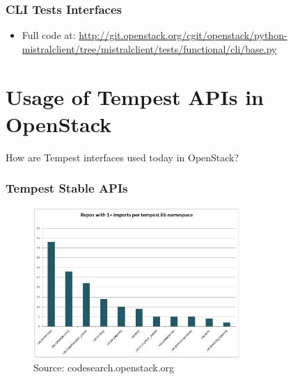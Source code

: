 \documentclass[aspectratio=169,11pt,hyperref={colorlinks=true}]{beamer}
\begin{document}
\begin{frame}
    \frametitle{CLI Tests Interfaces}
    
    \begin{itemize}
        \item \tiny Full code at: \href{http://git.openstack.org/cgit/openstack/python-mistralclient/tree/mistralclient/tests/functional/cli/base.py}{http://git.openstack.org/cgit/openstack/python-mistralclient/tree/mistralclient/tests/functional/cli/base.py}
    \end{itemize}
\end{frame}

\section{Usage of Tempest APIs in OpenStack}
\begin{frame}[c]
    \begin{center}
        \large How are Tempest interfaces used today in OpenStack?
    \end{center}
\end{frame}

\begin{frame}
    \frametitle{Tempest Stable APIs}
    \begin{figure}[p]
    	\centering
    	\includegraphics[width=0.7\textwidth]{lib-imports.png}
    	\caption{Source: codesearch.openstack.org}
    \end{figure}
\end{frame}
\end{document}
